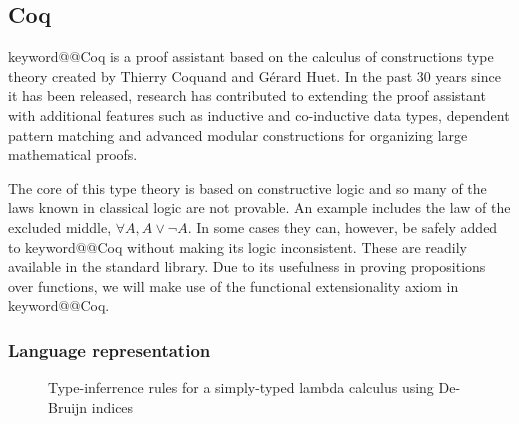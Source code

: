 \documentclass[11pt, final]{article}
\makeatletter
\def\<#1>{\csname keyword@@#1\endcsname}
\makeatother
\begin{document}

\subsection{Coq}

\<Coq> is a proof assistant based on the calculus of constructions type theory created by Thierry Coquand and G\'{e}rard Huet\cite{Coquand1988}.
In the past 30 years since it has been released, research has contributed to extending the proof assistant with additional features such as inductive and co-inductive data types\cite{Coquand1990}, dependent pattern matching\cite{Sozeau2010} and advanced modular constructions for organizing large mathematical proofs\cite{Sozeau2008}\cite{Mahboubi2013}.

The core of this type theory is based on constructive logic and so many of the laws known in classical logic are not provable.
An example includes the law of the excluded middle, $\forall A, A \vee \neg A$.
In some cases they can, however, be safely added to \<Coq> without making its logic inconsistent. These are readily available in the standard library.
Due to its usefulness in proving propositions over functions, we will make use of the functional extensionality axiom in \<Coq>.

\subsubsection{Language representation}
\label{sec:language_repr}

\begin{figure}
  \label{fig:stlc_infer}
  \caption{Type-inferrence rules for a simply-typed lambda calculus using De-Bruijn indices}
\end{figure}
\end{document}
